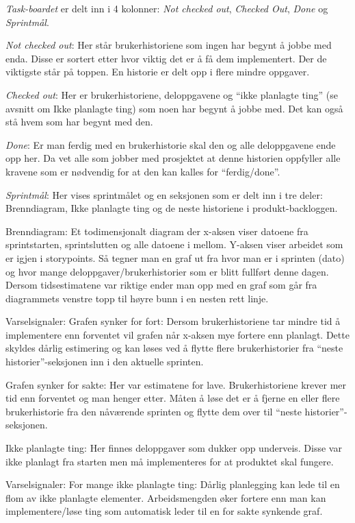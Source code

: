 \documentclass[12pt,a4paper,norsk]{article}
\begin{document}
    \textit{Task-boardet} er delt inn i 4 kolonner: \textit{Not checked out}, \textit{Checked Out}, \textit{Done} og \textit{Sprintmål}.
    
    \textit{Not checked out}: Her står brukerhistoriene som ingen har begynt å jobbe med enda. Disse er sortert etter hvor viktig det er å få dem implementert. Der de viktigste står på toppen. En historie er delt opp i flere mindre oppgaver.

    \textit{Checked out}: Her er brukerhistoriene, deloppgavene og “ikke planlagte ting” (se avsnitt om Ikke planlagte ting) som noen har begynt å jobbe med. Det kan også stå hvem som har begynt med den.

    \textit{Done}: Er man ferdig med en brukerhistorie skal den og alle deloppgavene ende opp her. Da vet alle som jobber med prosjektet at denne historien oppfyller alle kravene som er nødvendig for at den kan kalles for “ferdig/done”.
	
    \textit{Sprintmål}: Her vises sprintmålet og en seksjonen som er delt inn i tre deler: Brenndiagram, Ikke planlagte ting og de neste historiene i produkt-backloggen.

    Brenndiagram:
    Et todimensjonalt diagram der x-aksen viser datoene fra sprintstarten, sprintslutten og alle datoene i mellom. Y-aksen viser arbeidet som er igjen i storypoints. Så tegner man en graf ut fra hvor man er i sprinten (dato) og hvor mange deloppgaver/brukerhistorier som er blitt fullført denne dagen. Dersom tidsestimatene var riktige ender man opp med en graf som går fra diagrammets venstre topp til høyre bunn i en nesten rett linje.

    Varselsignaler:
	Grafen synker for fort:
    Dersom brukerhistoriene tar mindre tid å implementere enn forventet vil grafen når x-aksen mye fortere enn planlagt. Dette skyldes dårlig estimering og kan løses ved å flytte flere brukerhistorier fra “neste historier”-seksjonen inn i den aktuelle sprinten.

	Grafen synker for sakte:
    Her var estimatene for lave. Brukerhistoriene krever mer tid enn forventet og man henger etter. Måten å løse det er å fjerne en eller flere brukerhistorie fra den nåværende sprinten og flytte dem over til “neste historier”-seksjonen.

    Ikke planlagte ting:
    Her finnes deloppgaver som dukker opp underveis. Disse var ikke planlagt fra starten men må implementeres for at produktet skal fungere.

    Varselsignaler:
	For mange ikke planlagte ting:
    Dårlig planlegging kan lede til en flom av ikke planlagte elementer. Arbeidsmengden øker fortere enn man kan implementere/løse ting som automatisk leder til en for sakte synkende graf.
\end{document}
